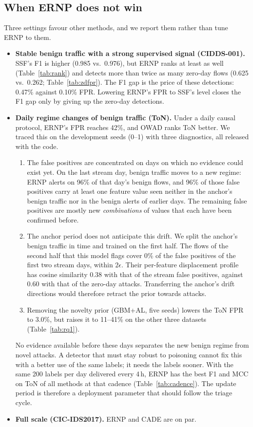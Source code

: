 \documentclass[a4paper,fleqn]{cas-dc}
\newcommand{\ERNP}{ERNP\xspace}
\begin{document}
\subsection{When ERNP does not win}
Three settings favour other methods, and we report them rather than tune \ERNP to them.
\begin{itemize}
  \item \textbf{Stable benign traffic with a strong supervised signal (CIDDS-001).} SSF's F1 is higher (0.985 vs.\ 0.976), but \ERNP ranks at least as well (Table~\ref{tab:rank}) and detects more than twice as many zero-day flows (0.625 vs.\ 0.262; Table~\ref{tab:zdfpr}). The F1 gap is the price of these detections: 0.47\% against 0.10\% FPR. Lowering \ERNP's FPR to SSF's level closes the F1 gap only by giving up the zero-day detections.
  \item \textbf{Daily regime changes of benign traffic (ToN).} Under a daily causal protocol, \ERNP's FPR reaches 42\%, and OWAD ranks ToN better. We traced this on the development seeds (0--1) with three diagnostics, all released with the code.
  \begin{enumerate}
    \item The false positives are concentrated on days on which no evidence could exist yet. On the last stream day, benign traffic moves to a new regime: \ERNP alerts on 96\% of that day's benign flows, and 96\% of those false positives carry at least one feature value seen neither in the anchor's benign traffic nor in the benign alerts of earlier days. The remaining false positives are mostly new \emph{combinations} of values that each have been confirmed before.
    \item The anchor period does not anticipate this drift. We split the anchor's benign traffic in time and trained on the first half. The flows of the second half that this model flags cover 0\% of the false positives of the first two stream days, within $2\epsilon$. Their per-feature displacement profile has cosine similarity 0.38 with that of the stream false positives, against 0.60 with that of the zero-day attacks. Transferring the anchor's drift directions would therefore retract the prior towards attacks.
    \item Removing the novelty prior (GBM+AL, five seeds) lowers the ToN FPR to 3.0\%, but raises it to 11--41\% on the other three datasets (Table~\ref{tab:rq1}).
  \end{enumerate}
  No evidence available before these days separates the new benign regime from novel attacks. A detector that must stay robust to poisoning cannot fix this with a better use of the same labels; it needs the labels sooner. With the same 200 labels per day delivered every 4\,h, \ERNP has the best F1 and MCC on ToN of all methods at that cadence (Table~\ref{tab:cadence}). The update period is therefore a deployment parameter that should follow the triage cycle.
  \item \textbf{Full scale (CIC-IDS2017).} \ERNP and CADE are on par.
\end{itemize}
\end{document}
